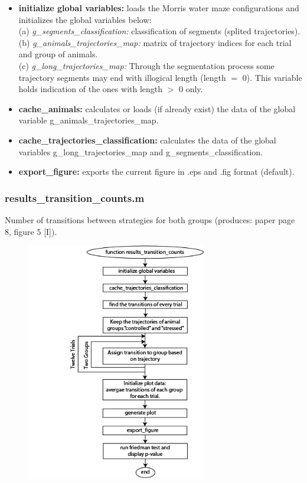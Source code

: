 \documentclass[12pt,titlepage]{article}
\begin{document}
\begin{doublespace}
\begin{itemize}
	\item\textbf{initialize global variables:} loads the Morris water maze configurations and initializes the global variables below:\\
	(a) \textit{g\_segments\_classification:} classification of segments (splited trajectories).\\
	(b) \textit{g\_animals\_trajectories\_map:} matrix of trajectory indices for each trial and group of animals.\\
	(c) \textit{g\_long\_trajectories\_map:} Through the segmentation process some trajectory segments may end with illogical length (length $=$ 0). This variable holds  indication of the ones with length $>$ 0 only.
	\item\textbf{cache\_animals:} calculates or loads (if already exist) the data of the global variable g\_animals\_trajectories\_map.
	\item\textbf{cache\_trajectories\_classification:}  calculates the data of the global variables g\_long\_trajectories\_map and g\_segments\_classification.
	\item\textbf{export\_figure:} exports the current figure in .eps and .fig format (default).
\end{itemize}


\subsubsection{results\_transition\_counts.m}
Number of transitions between
strategies for both groups (produces: paper page 8, figure 5 [I]).

\begin{figure}[H]
	\begin{center}
		\includegraphics[width=0.7\textwidth]{results_transition_counts.jpg}
		\label{fig5i}
	\end{center}
\end{figure}


\end{doublespace}
\end{document}
